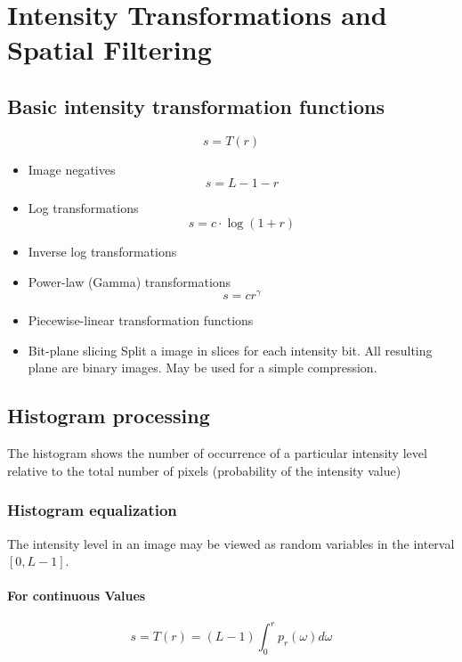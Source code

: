 \section{Intensity Transformations and Spatial Filtering }

\subsection{Basic intensity transformation functions}
\begin{equation}
s = T(r)
\end{equation}

\begin{itemize}
	\item Image negatives
		\begin{equation}
			s = L-1-r
		\end{equation}
	\item Log transformations
		\begin{equation}
			s = c \cdot \log{(1 + r)}
		\end{equation}
	\item Inverse log transformations
	\item Power-law (Gamma) transformations
		\begin{equation}
			s = c r^\gamma
		\end{equation}
	\item Piecewise-linear transformation functions
	\item Bit-plane slicing
		Split a image in slices for each intensity bit.  All resulting plane are binary images.
		May be used for a simple compression.
	
\end{itemize}


\subsection{Histogram processing}
The histogram shows the number of occurrence of a particular intensity level relative to the total number of pixels (probability of the intensity value)

\subsubsection{Histogram equalization}
The intensity level in an image may be viewed as random variables in the interval $[0, L-1]$.

\paragraph{For continuous Values}
\begin{equation}
	s = T(r) = (L-1)\int_0^r p_r(\omega) d\omega
\end{equation} 

